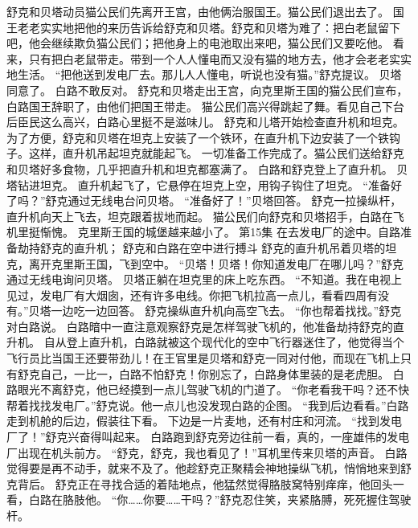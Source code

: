 \documentclass[a4paper,12pt,UTF8,twoside]{ctexbook}
\begin{document}
        舒克和贝塔动员猫公民们先离开王宫，由他俩治服国王。猫公民们退出去了。 
        国王老老实实地把他的来历告诉给舒克和贝塔。舒克和贝塔为难了：把白老鼠留下吧，他会继续欺负猫公民们；把他身上的电池取出来吧，猫公民们又要吃他。 
        看来，只有把白老鼠带走。带到一个人人懂电而又没有猫的地方去，他才会老老实实地生活。 
        “把他送到发电厂去。那儿人人懂电，听说也没有猫。”舒克提议。 
        贝塔同意了。 
        白路不敢反对。 
        舒克和贝塔走出王宫，向克里斯王国的猫公民们宣布，白路国王辞职了，由他们把国王带走。 
        猫公民们高兴得跳起了舞。看见自己下台后臣民这么高兴，白路心里挺不是滋味儿。 
        舒克和儿塔开始检查直升机和坦克。为了方便，舒克和贝塔在坦克上安装了一个铁环，在直升机下边安装了一个铁钩子。这样，直升机吊起坦克就能起飞。 
        一切准备工作完成了。猫公民们送给舒克和贝塔好多食物，几乎把直升机和坦克都塞满了。 
        白路和舒克登上了直升机。 
        贝塔钻进坦克。 
        直升机起飞了，它悬停在坦克上空，用钩子钩住了坦克。 
        “准备好了吗？”舒克通过无线电台问贝塔。 
        “准备好了！”贝塔回答。 
        舒克一拉操纵杆，直升机向天上飞去，坦克跟着拔地而起。 
        猫公民们向舒克和贝塔招手，白路在飞机里挺惭愧。 
        克里斯王国的城堡越来越小了。   第15集   
        在去发电厂的途中。自路准备劫持舒克的直升机； 
        舒克和白路在空中进行搏斗   
        舒克的直升机吊着贝塔的坦克，离开克里斯王国，飞到空中。 
        “贝塔！贝塔！你知道发电厂在哪儿吗？”舒克通过无线电询问贝塔。 
        贝塔正躺在坦克里的床上吃东西。 
        “不知道。我在电视上见过，发电厂有大烟囱，还有许多电线。你把飞机拉高一点儿，看看四周有没有。”贝塔一边吃一边回答。 
        舒克操纵直升机向高空飞去。 
        “你也帮着找找。”舒克对白路说。 
        白路暗中一直注意观察舒克是怎样驾驶飞机的，他准备劫持舒克的直升机。 
        自从登上直升机，白路就被这个现代化的空中飞行器迷住了，他觉得当个飞行员比当国王还要带劲儿！在王官里是贝塔和舒克一同对付他，而现在飞机上只有舒克自己，一比一，白路不怕舒克！你别忘了，白路身体里装的是老虎胆。 
        白路眼光不离舒克，他已经摸到一点儿驾驶飞机的门道了。 
        “你老看我干吗？还不快帮着找找发电厂。”舒克说。他一点儿也没发现白路的企图。 
        “我到后边看看。”白路走到机舱的后边，假装往下看。 
        下边是一片麦地，还有村庄和河流。 
        “找到发电厂了！”舒克兴奋得叫起来。 
        白路跑到舒克旁边往前一看，真的，一座雄伟的发电厂出现在机头前方。 
        “舒克，舒克，我也看见了！”耳机里传来贝塔的声音。 
        白路觉得要是再不动手，就来不及了。他趁舒克正聚精会神地操纵飞机，悄悄地来到舒克背后。 
        舒克正在寻找合适的着陆地点，他猛然觉得胳肢窝特别痒痒，他回头一看，白路在胳肢他。 
        “你……你要……干吗？”舒克忍住笑，夹紧胳膊，死死握住驾驶杆。 
\end{document}
